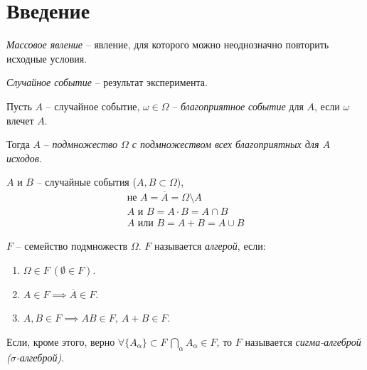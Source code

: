 

\section*{Введение}

\begin{note}
    \emph{Массовое явление} -- явление, для которого можно неоднозначно повторить исходные условия.

    \emph{Случайное событие} -- результат эксперимента.
\end{note}

\begin{definition}
    Пусть $ A $ -- случайное событие, $ \omega \in \Omega $ -- \emph{благоприятное событие} для $ A $, если $ \omega $ влечет $ A $.

    Тогда $ A $ -- \emph{подмножество $ \Omega $ с подмножеством всех благоприятных для $ A $ исходов}.
\end{definition}

\begin{example}
    $ A $ и $ B $ -- случайные события ($ A, B \subset \Omega $),
    \[
        \begin{array}{l}
            \text{не }A = \overline{A} = \Omega \setminus A \\
            A\text{ и }B = A \cdot B = A \cap B             \\
            A\text{ или }B = A + B = A \cup B
        \end{array}
    \]
\end{example}

\begin{definition}
    $ F $ -- семейство подмножеств $ \Omega $. $ F $ называется \emph{алгерой}, если:
    \begin{enumerate}
        \item $ \Omega \in F \ (\emptyset \in F) $.
        \item $ A \in F \implies \overline{A} \in F $.
        \item $ A,B \in F \implies AB \in F, \ A + B \in F $.
    \end{enumerate}

    Если, кроме этого, верно $ \forall \{A_\alpha\}\subset F \ \bigcap_\alpha A_\alpha \in F $, то $ F $ называется \emph{сигма-алгеброй ($ \sigma $-алгеброй)}.
\end{definition}


